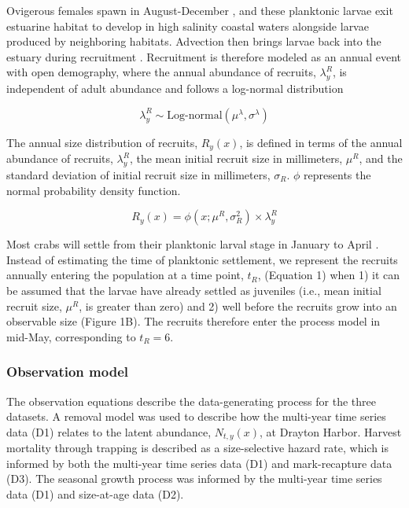 \documentclass{article}
\begin{document}
Ovigerous females spawn in August-December \parencite{klassen2007biological}, and these planktonic larvae exit estuarine habitat to develop in high salinity coastal waters alongside larvae produced by neighboring habitats. Advection then brings larvae back into the estuary during recruitment \parencite{young2019life}. Recruitment is therefore modeled as an annual event with open demography, where the annual abundance of recruits, $\lambda^R_y$, is independent of adult abundance and follows a log-normal distribution  

\begin{equation}
\lambda^R_y \sim \text{Log-normal}(\mu^{\lambda}, \sigma^{\lambda})
\end{equation}

The annual size distribution of recruits, $R_y(x)$, is defined in terms of the annual abundance of recruits, $\lambda^R_y$, the mean initial recruit size in millimeters, $\mu^R$, and the standard deviation of initial recruit size in millimeters, $\sigma_R$. $\phi$ represents the normal probability density function.

\begin{equation}
R_y(x) = \phi(x; \mu^R, \sigma^2_R) \times \lambda^R_y
\end{equation}

Most crabs will settle from their planktonic larval stage in January to April \parencite{yamada2005growth}. Instead of estimating the time of planktonic settlement, we represent the recruits annually entering the population at a time point, $t_R$, (Equation 1) when 1) it can be assumed that the larvae have already settled as juveniles (i.e., mean initial recruit size, $\mu^R$, is greater than zero) and 2) well before the recruits grow into an observable size (Figure 1B). The recruits therefore enter the process model in mid-May, corresponding to $t_R=6$. 

\subsubsection{Observation model}

The observation equations describe the data-generating process for the three datasets. A removal model was used to describe how the multi-year time series data (D1) relates to the latent abundance, $N_{t,y}(x)$, at Drayton Harbor. Harvest mortality through trapping is described as a size-selective hazard rate, which is informed by both the multi-year time series data (D1) and mark-recapture data (D3). The seasonal growth process was informed by the multi-year time series data (D1) and size-at-age data (D2).
\end{document}
